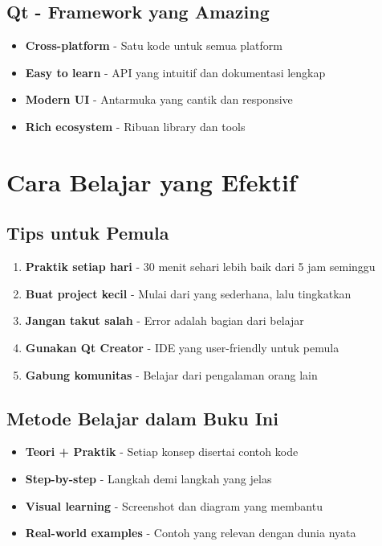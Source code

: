 \subsection*{Qt - Framework yang Amazing}
\begin{itemize}
\item \textbf{Cross-platform} - Satu kode untuk semua platform
\item \textbf{Easy to learn} - API yang intuitif dan dokumentasi lengkap
\item \textbf{Modern UI} - Antarmuka yang cantik dan responsive
\item \textbf{Rich ecosystem} - Ribuan library dan tools
\end{itemize}

\section*{Cara Belajar yang Efektif}

\subsection*{Tips untuk Pemula}
\begin{enumerate}
\item \textbf{Praktik setiap hari} - 30 menit sehari lebih baik dari 5 jam seminggu
\item \textbf{Buat project kecil} - Mulai dari yang sederhana, lalu tingkatkan
\item \textbf{Jangan takut salah} - Error adalah bagian dari belajar
\item \textbf{Gunakan Qt Creator} - IDE yang user-friendly untuk pemula
\item \textbf{Gabung komunitas} - Belajar dari pengalaman orang lain
\end{enumerate}

\subsection*{Metode Belajar dalam Buku Ini}
\begin{itemize}
\item \textbf{Teori + Praktik} - Setiap konsep disertai contoh kode
\item \textbf{Step-by-step} - Langkah demi langkah yang jelas
\item \textbf{Visual learning} - Screenshot dan diagram yang membantu
\item \textbf{Real-world examples} - Contoh yang relevan dengan dunia nyata
\end{itemize}

